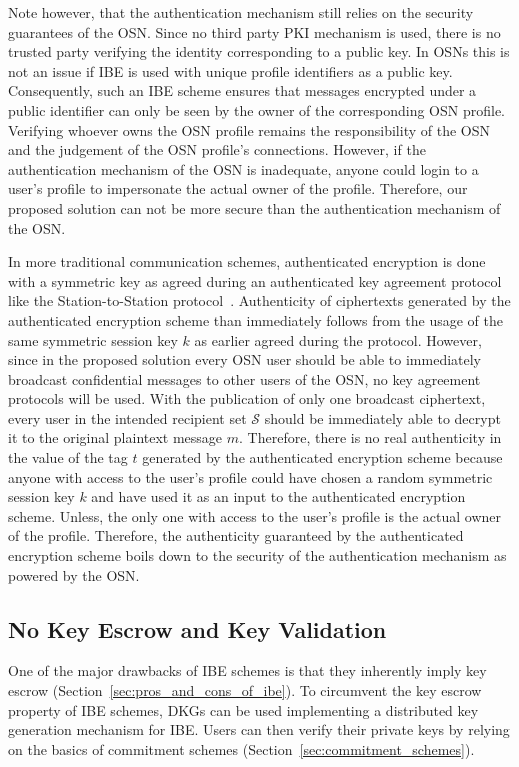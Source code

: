 Note however, that the authentication mechanism still relies on the security guarantees of the OSN. Since no third party PKI mechanism is used, there is no trusted party verifying the identity corresponding to a public key. In OSNs this is not an issue if IBE is used with unique profile identifiers as a public key. Consequently, such an IBE scheme ensures that messages encrypted under a public identifier can only be seen by the owner of the corresponding OSN profile. Verifying whoever owns the OSN profile remains the responsibility of the OSN and the judgement of the OSN profile's connections. However, if the authentication mechanism of the OSN is inadequate, anyone could login to a user's profile to impersonate the actual owner of the profile. Therefore, our proposed solution can not be more secure than the authentication mechanism of the OSN.

In more traditional communication schemes, authenticated encryption is done with a symmetric key as agreed during an authenticated key agreement protocol like the Station-to-Station protocol~\cite{art:DiffieOW92}. Authenticity of ciphertexts generated by the authenticated encryption scheme than immediately follows from the usage of the same symmetric session key $k$ as earlier agreed during the protocol. However, since in the proposed solution every OSN user should be able to immediately broadcast confidential messages to other users of the OSN, no key agreement protocols will be used. With the publication of only one broadcast ciphertext, every user in the intended recipient set $\mathcal{S}$ should be immediately able to decrypt it to the original plaintext message $m$. Therefore, there is no real authenticity in the value of the tag $t$ generated by the authenticated encryption scheme because anyone with access to the user's profile could have chosen a random symmetric session key $k$ and have used it as an input to the authenticated encryption scheme. Unless, the only one with access to the user's profile is the actual owner of the profile. Therefore, the authenticity guaranteed by the authenticated encryption scheme boils down to the security of the authentication mechanism as powered by the OSN.


\subsection{No Key Escrow and Key Validation}
One of the major drawbacks of IBE schemes is that they inherently imply key escrow (Section~\ref{sec:pros_and_cons_of_ibe}). To circumvent the key escrow property of IBE schemes, DKGs can be used implementing a distributed key generation mechanism for IBE. Users can then verify their private keys by relying on the basics of commitment schemes (Section~\ref{sec:commitment_schemes}).

